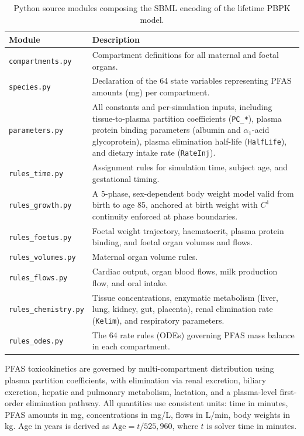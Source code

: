 \documentclass[12pt]{article}
\begin{document}
\begin{table}[h]
\centering
\caption{Python source modules composing the SBML encoding of the
lifetime PBPK model.}
\label{tab:sbml_modules}
\begin{tabular}{p{3.8cm} p{9.5cm}}
\toprule
\textbf{Module} & \textbf{Description} \\
\midrule
\texttt{compartments.py}
& Compartment definitions for all maternal and foetal organs. \\
\texttt{species.py}
& Declaration of the 64 state variables representing PFAS
  amounts (mg) per compartment. \\
\texttt{parameters.py}
& All constants and per-simulation inputs, including
  tissue-to-plasma partition coefficients (\texttt{PC\_*}),
  plasma protein binding parameters (albumin and
  $\alpha_1$-acid glycoprotein), plasma elimination half-life
  (\texttt{HalfLife}), and dietary intake rate
  (\texttt{RateInj}). \\
\texttt{rules\_time.py}
& Assignment rules for simulation time, subject age, and
  gestational timing. \\
\texttt{rules\_growth.py}
& A 5-phase, sex-dependent body weight model valid from birth
  to age 85, anchored at birth weight with $C^1$ continuity
  enforced at phase boundaries. \\
\texttt{rules\_foetus.py}
& Foetal weight trajectory, haematocrit, plasma protein
  binding, and foetal organ volumes and flows. \\
\texttt{rules\_volumes.py}
& Maternal organ volume rules. \\
\texttt{rules\_flows.py}
& Cardiac output, organ blood flows, milk production flow,
  and oral intake. \\
\texttt{rules\_chemistry.py}
& Tissue concentrations, enzymatic metabolism (liver, lung,
  kidney, gut, placenta), renal elimination rate
  (\texttt{Kelim}), and respiratory parameters. \\
\texttt{rules\_odes.py}
& The 64 rate rules (ODEs) governing PFAS mass balance in
  each compartment. \\
\bottomrule
\end{tabular}
\end{table}

PFAS toxicokinetics are governed by multi-compartment distribution
using plasma partition coefficients, with elimination via renal
excretion, biliary excretion, hepatic and pulmonary metabolism,
lactation, and a plasma-level first-order elimination pathway.
All quantities use consistent units: time in minutes, PFAS amounts
in mg, concentrations in mg/L, flows in L/min, body weights in kg.
Age in years is derived as $\text{Age} = t / 525{,}960$, where $t$
is solver time in minutes.
\end{document}
